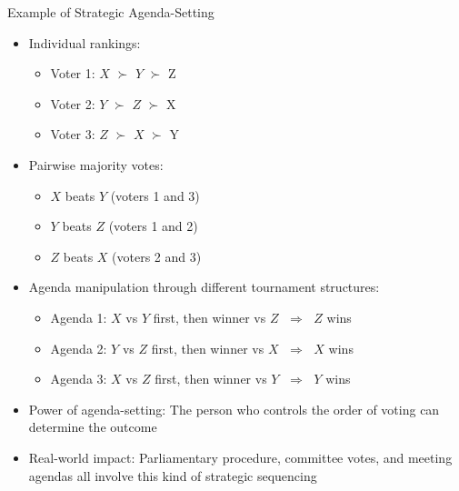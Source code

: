 \documentclass[10pt]{beamer}
\newcommand{\ie}{\;\Longrightarrow\;}
\begin{document}
\begin{frame}{Example of Strategic Agenda-Setting}
  \begin{itemize}[<+->]
    \item Individual rankings:
      \begin{itemize}
        \item Voter 1: $X$ $\succ$ $Y$ $\succ$ Z
        \item Voter 2: $Y$ $\succ$ $Z$ $\succ$ X
        \item Voter 3: $Z$ $\succ$ $X$ $\succ$ Y
      \end{itemize}
    \item Pairwise majority votes:
      \begin{itemize}
        \item $X$ beats $Y$ (voters 1 and 3)
        \item $Y$ beats $Z$ (voters 1 and 2)
        \item $Z$ beats $X$ (voters 2 and 3)
      \end{itemize}
    \item Agenda manipulation through different tournament structures:
      \begin{itemize}
        \item Agenda 1: $X$ vs $Y$ first, then winner vs $Z$ $\ie$ $Z$ wins
        \item Agenda 2: $Y$ vs $Z$ first, then winner vs $X$ $\ie$ $X$ wins
        \item Agenda 3: $X$ vs $Z$ first, then winner vs $Y$ $\ie$ $Y$ wins
      \end{itemize}
    \item Power of agenda-setting: The person who controls the order of voting can determine the outcome
    \item Real-world impact: Parliamentary procedure, committee votes, and meeting agendas all involve this kind of strategic sequencing
  \end{itemize}
\end{frame}
\end{document}
